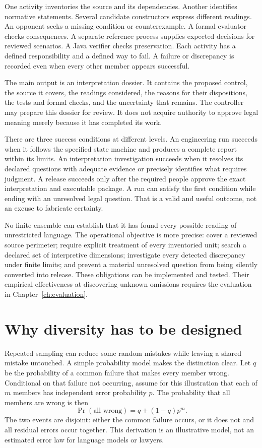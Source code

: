 \documentclass[12pt,a4paper,oneside,openany]{book}
\begin{document}
One activity inventories the source and its dependencies. Another identifies
normative statements. Several candidate constructors express different readings.
An opponent seeks a missing condition or counterexample. A formal evaluator
checks consequences. A separate reference process supplies expected decisions
for reviewed scenarios. A Java verifier checks preservation. Each activity has a
defined responsibility and a defined way to fail. A failure or discrepancy is
recorded even when every other member appears successful.

The main output is an interpretation dossier. It contains the proposed control,
the source it covers, the readings considered, the reasons for their dispositions,
the tests and formal checks, and the uncertainty that remains. The controller
may prepare this dossier for review. It does not acquire authority to approve
legal meaning merely because it has completed its work.

There are three success conditions at different levels. An engineering run
succeeds when it follows the specified state machine and produces a complete
report within its limits. An interpretation investigation succeeds when it
resolves its declared questions with adequate evidence or precisely identifies
what requires judgment. A release succeeds only after the required people approve
the exact interpretation and executable package. A run can satisfy the first
condition while ending with an unresolved legal question. That is a valid and
useful outcome, not an excuse to fabricate certainty.

No finite ensemble can establish that it has found every possible reading of
unrestricted language. The operational objective is more precise: cover a
reviewed source perimeter; require explicit treatment of every inventoried unit;
search a declared set of interpretive dimensions; investigate every detected
discrepancy under finite limits; and prevent a material unresolved question from
being silently converted into release. These obligations can be implemented and
tested. Their empirical effectiveness at discovering unknown omissions requires
the evaluation in Chapter~\ref{ch:evaluation}.

\section{Why diversity has to be designed}

Repeated sampling can reduce some random mistakes while leaving a shared mistake
untouched. A simple probability model makes the distinction clear. Let $q$ be the
probability of a common failure that makes every member wrong. Conditional on
that failure not occurring, assume for this illustration that each of $m$ members
has independent error probability $p$. The probability that all members are wrong
is then
\begin{equation}
 \Pr(\text{all wrong})=q+(1-q)p^m.
 \label{eq:common-error}
\end{equation}
The two events are disjoint: either the common failure occurs, or it does not and
all residual errors occur together. This derivation is an illustrative model,
not an estimated error law for language models or lawyers.
\end{document}
